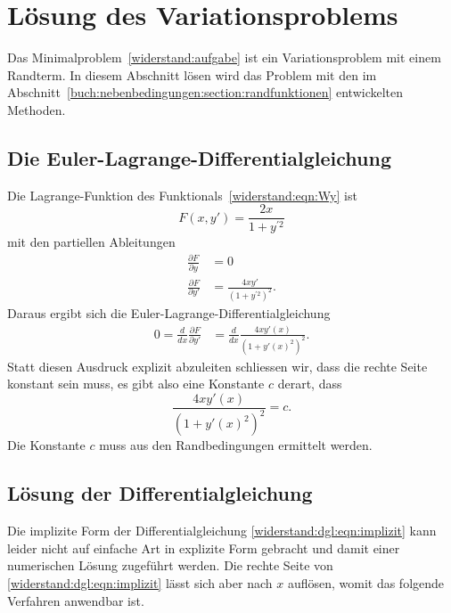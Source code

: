%
%
%
%
\section{Lösung des Variationsproblems
\label{widerstand:section:loesung}}
Das Minimalproblem~\ref{widerstand:aufgabe} ist ein Variationsproblem
mit einem Randterm.
In diesem Abschnitt lösen wird das Problem mit den im
Abschnitt~\ref{buch:nebenbedingungen:section:randfunktionen}
entwickelten Methoden.

%
%
\subsection{Die Euler-Lagrange-Differentialgleichung}
Die Lagrange-Funktion des Funktionals~\eqref{widerstand:eqn:Wy} ist 
\[
F(x,y')
=
\frac{2x}{1+y^{\prime 2}}
\]
mit den partiellen Ableitungen
\begin{align*}
\frac{\partial F}{\partial y}&=0
\\
\frac{\partial F}{\partial y'}
&=
\frac{4xy'}{(1+y^{\prime 2})^2}.
\end{align*}
Daraus ergibt sich die Euler-Lagrange-Differentialgleichung
\begin{align*}
0
=
\frac{d}{dx} \frac{\partial F}{\partial y'}
&=
\frac{d}{dx}
\frac{4xy'(x)}{(1+y'(x)^2)^2}.
\end{align*}
Statt diesen Ausdruck explizit abzuleiten schliessen wir, dass die rechte
Seite konstant sein muss, es gibt also eine Konstante $c$ derart, dass
\begin{equation}
\frac{ 4xy'(x) }{ (1+y'(x)^2)^2 } = c.
\label{widerstand:dgl:eqn:implizit}
\end{equation}
Die Konstante $c$ muss aus den Randbedingungen ermittelt werden.

%
%
\subsection{Lösung der Differentialgleichung}
Die implizite Form der Differentialgleichung
\eqref{widerstand:dgl:eqn:implizit}
kann leider nicht auf einfache Art in explizite Form gebracht und damit
einer numerischen Lösung zugeführt werden.
Die rechte Seite von \eqref{widerstand:dgl:eqn:implizit} lässt sich
aber nach $x$ auflösen, womit das folgende Verfahren anwendbar ist.

